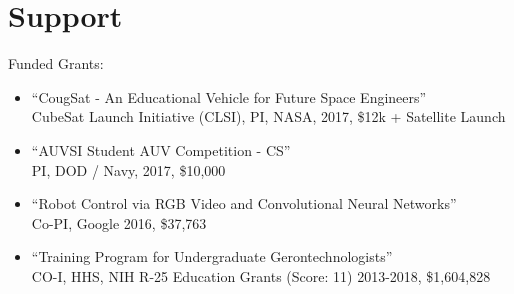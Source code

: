 \AOCLine
\section*{Support}
\label{sec:support}

Funded Grants:
\begin{itemize}
	\item{``CougSat - An Educational Vehicle for Future Space Engineers'' \\\indent CubeSat Launch Initiative (CLSI), PI, NASA, 2017, \$12k + Satellite Launch}
  \item{``AUVSI Student AUV Competition - CS'' \\\indent PI, DOD / Navy, 2017, \$10,000}
  \item{``Robot Control via RGB Video and Convolutional Neural Networks'' \\\indent Co-PI, Google 2016, \$37,763}
  \item{``Training Program for Undergraduate Gerontechnologists'' \\\indent CO-I, HHS, NIH R-25 Education Grants (Score: 11) 2013-2018, \$1,604,828}
\end{itemize}




